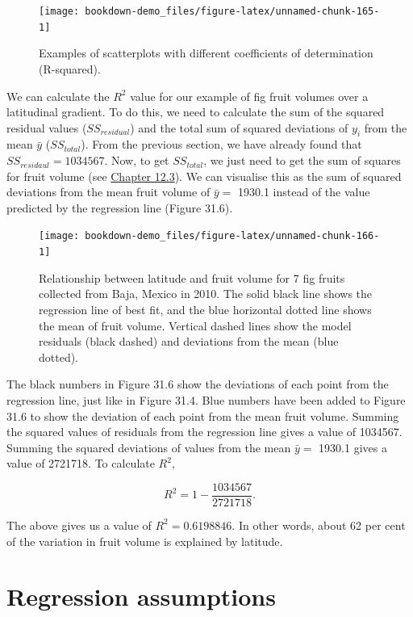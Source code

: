 \documentclass[
]{scrbook}
\begin{document}
\begin{figure}
\texttt{[image: bookdown-demo\_files/figure-latex/unnamed-chunk-165-1]} \caption{Examples of scatterplots with different coefficients of determination (R-squared).}\label{fig:unnamed-chunk-165}
\end{figure}

We can calculate the \(R^{2}\) value for our example of fig fruit volumes over a latitudinal gradient.
To do this, we need to calculate the sum of the squared residual values (\(SS_{residual}\)) and the total sum of squared deviations of \(y_{i}\) from the mean \(\bar{y}\) (\(SS_{total}\)).
From the previous section, we have already found that \(SS_{residaul} = 1034567\).
Now, to get \(SS_{total}\), we just need to get the sum of squares for fruit volume (see \protect\hyperlink{the-variance}{Chapter 12.3}).
We can visualise this as the sum of squared deviations from the mean fruit volume of \(\bar{y} =\) 1930.1 instead of the value predicted by the regression line (Figure 31.6).

\begin{figure}
\texttt{[image: bookdown-demo\_files/figure-latex/unnamed-chunk-166-1]} \caption{Relationship between latitude and fruit volume for 7 fig fruits collected from Baja, Mexico in 2010. The solid black line shows the regression line of best fit, and the blue horizontal dotted line shows the mean of fruit volume. Vertical dashed lines show the model residuals (black dashed) and deviations from the mean (blue dotted).}\label{fig:unnamed-chunk-166}
\end{figure}

The black numbers in Figure 31.6 show the deviations of each point from the regression line, just like in Figure 31.4.
Blue numbers have been added to Figure 31.6 to show the deviation of each point from the mean fruit volume.
Summing the squared values of residuals from the regression line gives a value of 1034567.
Summing the squared deviations of values from the mean \(\bar{y} =\) 1930.1 gives a value of 2721718.
To calculate \(R^{2}\),

\[R^{2} = 1 - \frac{1034567}{2721718}.\]

The above gives us a value of \(R^{2} = 0.6198846\).
In other words, about 62 per cent of the variation in fruit volume is explained by latitude.

\hypertarget{regression-assumptions}{%
\section{Regression assumptions}\label{regression-assumptions}}
\end{document}
